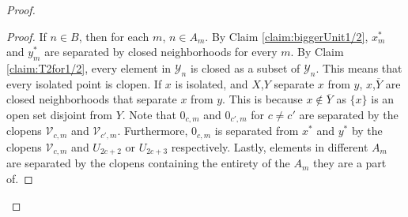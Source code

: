 \documentclass[10pt,a4paper]{amsart}
\begin{document}
\begin{proof}
\begin{proof}
        If $n\in B$, then for each $m$, $n\in A_m$.
        By Claim \ref{claim:biggerUnit1/2}, $x^*_m$ and $y^*_m$ are separated by closed neighborhoods for every $m$.
        By Claim \ref{claim:T2for1/2}, every element in $\mathcal{Y}_n$ is closed as a subset of $\mathcal{Y}_n$.
        This means that every isolated point is clopen.
        If $x$ is isolated, and $X$,$Y$ separate $x$ from $y$, $x$,$\overline{Y}$ are closed neighborhoods that separate $x$ from $y$.
        This is because $x\not\in \overline{Y}$ as $\{x\}$ is an open set disjoint from $Y$.
        Note that $0_{c,m}$ and $0_{c',m}$ for $c\neq c'$ are separated by the clopens $\mathcal{V}_{c,m}$ and $\mathcal{V}_{c',m}$.
        Furthermore, $0_{c,m}$ is separated from $x^*$ and $y^*$ by the clopens $\mathcal{V}_{c,m}$ and $U_{2c+2}$ or $U_{2c+3}$ respectively.
        Lastly, elements in different $A_m$ are separated by the clopens containing the entirety of the $A_m$ they are a part of.
    \end{proof}

    \end{proof}
\end{document}
